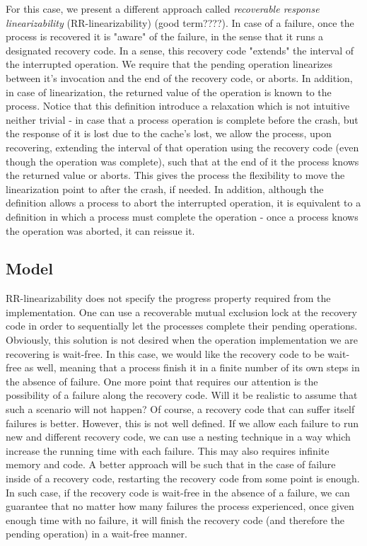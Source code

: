 \documentclass{article}
\begin{document}
For this case, we present a different approach called \emph{recoverable response linearizability} (RR-linearizability) (good term????). In case of a failure, once the process is recovered it is "aware" of the failure, in the sense that it runs a designated recovery code. In a sense, this recovery code "extends" the interval of the interrupted operation. We require that the pending operation linearizes between it's invocation and the end of the recovery code, or aborts. In addition, in case of linearization, the returned value of the operation is known to the process. Notice that this definition introduce a relaxation which is not intuitive neither trivial - in case that a process operation is complete before the crash, but the response of it is lost due to the cache's lost, we allow the process, upon recovering, extending the interval of that operation using the recovery code (even though the operation was complete), such that at the end of it the process knows the returned value or aborts. This gives the process the flexibility to move the linearization point to after the crash, if needed. In addition, although the definition allows a process to abort the interrupted operation, it is equivalent to a definition in which a process must complete the operation - once a process knows the operation was aborted, it can reissue it.


\subsection{Model}

RR-linearizability does not specify the progress property required from the implementation. One can use a recoverable mutual exclusion lock at the recovery code in order to sequentially let the processes complete their pending operations. Obviously, this solution is not desired when the operation implementation we are recovering is wait-free. In this case, we would like the recovery code to be wait-free as well, meaning that a process finish it in a finite number of its own steps in the absence of failure. One more point that requires our attention is the possibility of a failure along the recovery code. Will it be realistic to assume that such a scenario will not happen? Of course, a recovery code that can suffer itself failures is better. However, this is not well defined. If we allow each failure to run new and different recovery code, we can use a nesting technique in a way which increase the running time with each failure. This may also requires infinite memory and code. A better approach will be such that in the case of failure inside of a recovery code, restarting the recovery code from some point is enough. In such case, if the recovery code is wait-free in the absence of a failure, we can guarantee that no matter how many failures the process experienced, once given enough time with no failure, it will finish the recovery code (and therefore the pending operation) in a wait-free manner.
\end{document}
